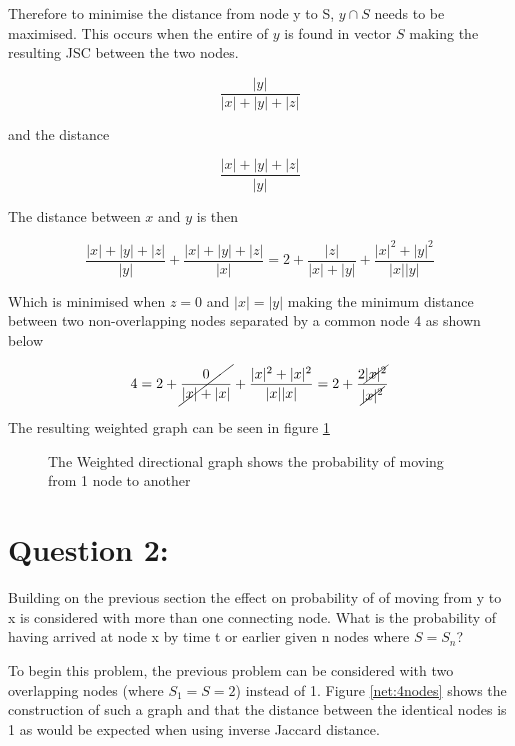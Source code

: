 Therefore to minimise the distance from node y to S, $y \cap S$ needs to be maximised. This occurs when the entire of $y$ is found in vector $S$ making the resulting JSC between the two nodes. 

\begin{equation}
    \frac{|y|}{|x|+|y|+|z|}
\end{equation}

and the distance

\begin{equation}
    \frac{|x|+|y|+|z|}{|y|}
\end{equation}

The distance between $x$ and $y$ is then

\begin{equation}
    \frac{|x|+|y|+|z|}{|y|} +\frac{|x|+|y|+|z|}{|x|} = 2 + \frac{|z|}{|x|+|y|}+\frac{|x|^2+|y|^2}{|x||y|}
\end{equation}

Which is minimised when $z=0$ and $|x|=|y|$ making the minimum distance between two non-overlapping nodes separated by a common node 4 as shown below


\begin{equation}
    4 =2 + \cancel{\frac{0}{|x|+|x|}}+\frac{|x|^2+|x|^2}{|x||x|} =2+\frac{2\cancel{|x|^2}}{\cancel{|x|^2}}
\end{equation}


The resulting weighted graph can be seen in figure \ref{net:weight3nodes}

\begin{figure}
    \centering
    
    \caption[Three Node directed graph]{The Weighted directional graph shows the probability of moving from 1 node to another}
    \label{net:weight3nodes}
\end{figure}

\section{Question 2:}
Building on the previous section the effect on probability of of moving from y to x is considered with more than one connecting node. What is the probability of having arrived at node x by time t or earlier given n nodes where $S=S_n$?

To begin this problem, the previous problem can be considered with two overlapping nodes (where $S_1=S=2$) instead of 1. Figure \ref{net:4nodes} shows the construction of such a graph and that the distance between the identical nodes is 1 as would be expected when using inverse Jaccard distance.


